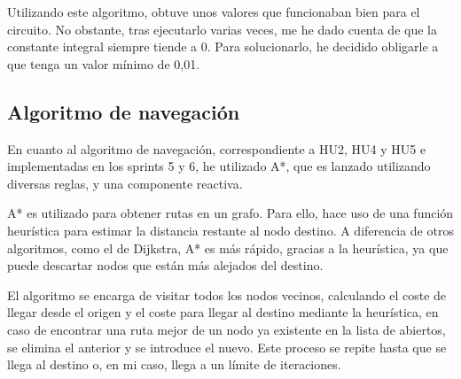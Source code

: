 \bigskip

Utilizando este algoritmo, obtuve unos valores que funcionaban bien para el circuito. No obstante, tras ejecutarlo varias veces, me he dado cuenta de que la constante integral siempre tiende a 0. Para solucionarlo, he decidido obligarle a que tenga un valor mínimo de 0,01.

\newpage

\subsection{Algoritmo de navegación}

En cuanto al algoritmo de navegación, correspondiente a HU2, HU4 y HU5 e implementadas en los sprints 5 y 6, he utilizado A*\cite{4082128}, que es lanzado utilizando diversas reglas, y una componente reactiva. 

\bigskip

A* es utilizado para obtener rutas en un grafo. Para ello, hace uso de una función heurística para estimar la distancia restante al nodo destino. A diferencia de otros algoritmos, como el de Dijkstra, A* es más rápido, gracias a la heurística, ya que puede descartar nodos que están más alejados del destino.

\bigskip

El algoritmo se encarga de visitar todos los nodos vecinos, calculando el coste de llegar desde el origen y el coste para llegar al destino mediante la heurística, en caso de encontrar una ruta mejor de un nodo ya existente en la lista de abiertos, se elimina el anterior y se introduce el nuevo. Este proceso se repite hasta que se llega al destino o, en mi caso, llega a un límite de iteraciones.







